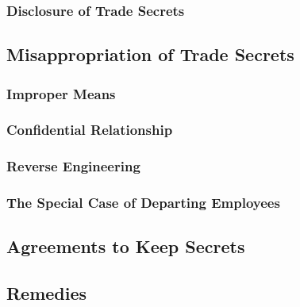 
\subsubsection{Disclosure of Trade Secrets}


\subsection{Misappropriation of Trade Secrets}

\subsubsection{Improper Means}


\subsubsection{Confidential Relationship}


\subsubsection{Reverse Engineering}


\subsubsection{The Special Case of Departing Employees}


\subsection{Agreements to Keep Secrets}


\subsection{Remedies}

